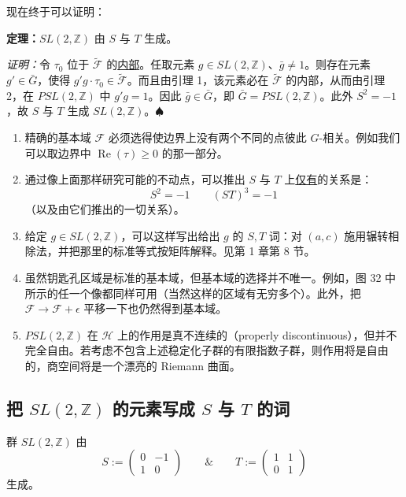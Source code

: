 现在终于可以证明：

\textbf{定理：}$SL(2,\mathbb{Z})$ 由 $S$ 与 $T$ 生成。

\textit{证明：}令 $\tau_0$ 位于 $\tilde{\mathcal{F}}$ 的\underline{内部}。任取元素 $g\in SL(2,\mathbb{Z})$、$\bar g\ne1$。则存在元素 $g'\in\bar G$，使得 $g'g\cdot\tau_0\in\tilde{\mathcal{F}}$。而且由引理 1，该元素必在 $\tilde{\mathcal{F}}$ 的内部，从而由引理 2，在 $PSL(2,\mathbb{Z})$ 中 $g'g=1$。因此 $\bar g\in\bar G$，即 $\bar G=PSL(2,\mathbb{Z})$。此外 $S^2=-1$，故 $S$ 与 $T$ 生成 $SL(2,\mathbb{Z})$。$\spadesuit$

\begin{enumerate}
  \item 精确的基本域 $\mathcal{F}$ 必须选得使边界上没有两个不同的点彼此 $G$-相关。例如我们可以取边界中 $\operatorname{Re}(\tau)\ge0$ 的那一部分。

  \item 通过像上面那样研究可能的不动点，可以推出 $S$ 与 $T$ 上\underline{仅有}的关系是：
  \begin{equation}
    S^2=-1\qquad (ST)^3=-1
    \tag{C.11}
    \label{eq:C.11}
  \end{equation}
  （以及由它们推出的一切关系）。

  \item 给定 $g\in SL(2,\mathbb{Z})$，可以这样写出给出 $g$ 的 $S,T$ 词：对 $(a,c)$ 施用辗转相除法，并把那里的标准等式按矩阵解释。见第 1 章第 8 节。

  \item 虽然钥匙孔区域是标准的基本域，但基本域的选择并不唯一。例如，图 32 中所示的任一个像都同样可用（当然这样的区域有无穷多个）。此外，把 $\mathcal{F}\to\mathcal{F}+\epsilon$ 平移一下也仍然得到基本域。

  \item $PSL(2,\mathbb{Z})$ 在 $\mathcal{H}$ 上的作用是真不连续的（properly discontinuous），但并不完全自由。若考虑不包含上述稳定化子群的有限指数子群，则作用将是自由的，商空间将是一个漂亮的 Riemann 曲面。
\end{enumerate}

\subsection{把 $SL(2,\mathbb{Z})$ 的元素写成 $S$ 与 $T$ 的词} %

群 $SL(2,\mathbb{Z})$ 由
\begin{equation}
  S:=\begin{pmatrix}
    0 & -1\\
    1 & 0
  \end{pmatrix}
  \qquad\&\qquad
  T:=\begin{pmatrix}
    1 & 1\\
    0 & 1
  \end{pmatrix}
  \tag{C.12}
  \label{eq:C.12}
\end{equation}
生成。

